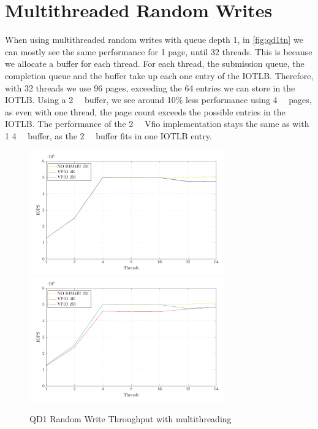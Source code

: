 \section{Multithreaded Random Writes}
When using multithreaded random writes with queue depth 1, in \autoref{fig:qd1tn} we can mostly see the same performance for 1 page, until 32 threads. This is because we allocate a buffer for each thread. For each thread, the submission queue, the completion queue and the buffer take up each one entry of the IOTLB. Therefore, with 32 threads we use 96 pages, exceeding the 64 entries we can store in the IOTLB. Using a \qty{2}{\mebi\byte} buffer, we see around 10\% less performance using \qty{4}{\kibi\byte} pages, as even with one thread, the page count exceeds the possible entries in the IOTLB. The performance of the \qty{2}{\mebi\byte} Vfio implementation stays the same as with 1 \qty{4}{\kibi\byte} buffer, as the \qty{2}{\mebi\byte} buffer fits in one IOTLB entry.

\begin{figure}
    \centering
     {\includegraphics[width=0.75\textwidth]{figures/qd1tn_1page}}
     {\includegraphics[width=0.75\textwidth]{figures/qd1tn_512page}}
    \caption{QD1 Random Write Throughput with multithreading}
    \label{fig:qd1tn}
\end{figure}

